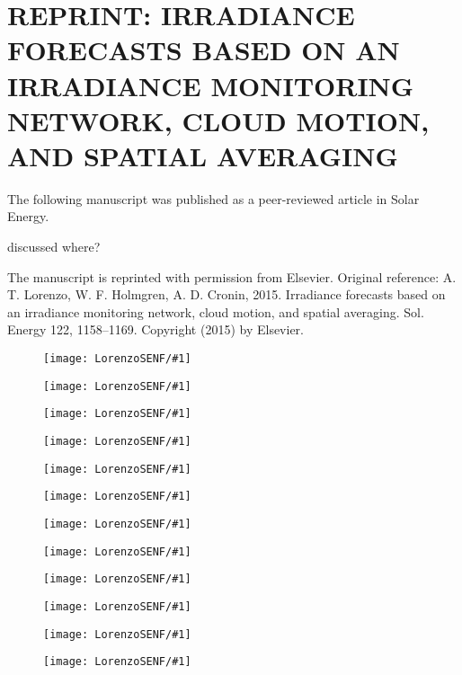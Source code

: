 \chapter{REPRINT: IRRADIANCE FORECASTS BASED ON AN IRRADIANCE MONITORING NETWORK, CLOUD MOTION, AND SPATIAL AVERAGING}
\label{app:network}
The following manuscript was published as a peer-reviewed article in
Solar Energy.

discussed where?

The manuscript is reprinted with permission from Elsevier. Original
reference: A. T. Lorenzo, W. F. Holmgren, A. D. Cronin,
2015. Irradiance forecasts based on an irradiance monitoring network,
cloud motion, and spatial averaging. Sol. Energy 122, 1158--1169.
Copyright (2015) by Elsevier.

\newcommand{\figNF}[1]{
\begin{figure}
\texttt{[image: LorenzoSENF/\#1]}
\end{figure}
}


\figNF{pg1}
\figNF{pg2}
\figNF{pg3}
\figNF{pg4}
\figNF{pg5}
\figNF{pg6}
\figNF{pg7}
\figNF{pg8}
\figNF{pg9}
\figNF{pg10}
\figNF{pg11}
\figNF{pg12}

